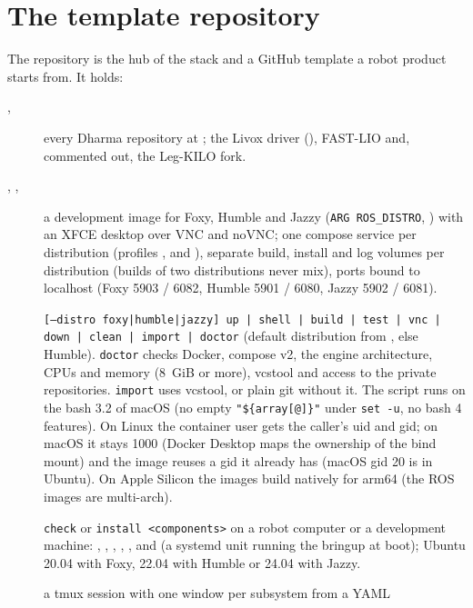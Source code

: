 \section{The template repository}
\label{sec:template}

The  repository is the hub of the stack and a GitHub template a robot product starts
from. It holds:
\begin{description}
  \item[, ] every Dharma repository at ; the
    Livox driver (), FAST-LIO and, commented out, the Leg-KILO fork.
  \item[, , ] a development image for
    Foxy, Humble and Jazzy (\texttt{ARG ROS\_DISTRO}, ) with an XFCE
    desktop over VNC and noVNC; one compose service per distribution (profiles ,
     and ), separate build, install and log volumes per distribution
    (builds of two distributions never mix), ports bound to localhost (Foxy 5903 / 6082, Humble
    5901 / 6080, Jazzy 5902 / 6081).
  \item[] \texttt{[--distro foxy|humble|jazzy] up | shell | build | test |
    vnc | down | clean | import | doctor} (default distribution from , else
    Humble). \texttt{doctor} checks Docker, compose v2, the engine architecture, CPUs and memory
    (8~GiB or more), vcstool and access to the private repositories. \texttt{import} uses
    vcstool, or plain git without it. The script runs on the bash 3.2 of macOS (no empty
    \texttt{"\$\{array[@]\}"} under \texttt{set -u}, no bash 4 features). On Linux the container
    user gets the caller's uid and gid; on macOS it stays 1000 (Docker Desktop maps the ownership
    of the bind mount) and the image reuses a gid it already has (macOS gid 20 is
     in Ubuntu). On Apple Silicon the images build natively for arm64 (the ROS
    images are multi-arch).
  \item[] \texttt{check} or \texttt{install <components>} on a robot
    computer or a development machine: , , , ,
    ,  and  (a systemd unit running the bringup at boot);
    Ubuntu 20.04 with Foxy, 22.04 with Humble or 24.04 with Jazzy.
  \item[] a tmux session with one window per subsystem from a YAML

\end{description}
